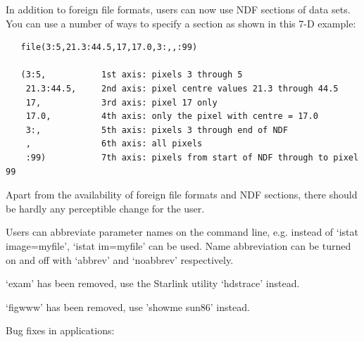    In addition to foreign file formats, users can now use NDF sections
   of data sets. You can use a number of ways to specify a section as
   shown in this 7-D example:

\begin{verbatim}
   file(3:5,21.3:44.5,17,17.0,3:,,:99)

   (3:5,           1st axis: pixels 3 through 5
    21.3:44.5,     2nd axis: pixel centre values 21.3 through 44.5
    17,            3rd axis: pixel 17 only
    17.0,          4th axis: only the pixel with centre = 17.0
    3:,            5th axis: pixels 3 through end of NDF
    ,              6th axis: all pixels
    :99)           7th axis: pixels from start of NDF through to pixel 99
\end{verbatim}

   Apart from the availability of foreign file formats and NDF sections,
   there should be hardly any perceptible change for the user.

   Users can abbreviate parameter names on the command line, e.g. instead
   of `istat image=myfile', `istat im=myfile' can be used.
   Name abbreviation
   can be turned on and off with `abbrev' and `noabbrev' respectively.

   `exam' has been removed, use the Starlink utility `hdstrace' instead.

   `figwww' has been removed, use 'showme sun86' instead.

   Bug fixes in applications:


